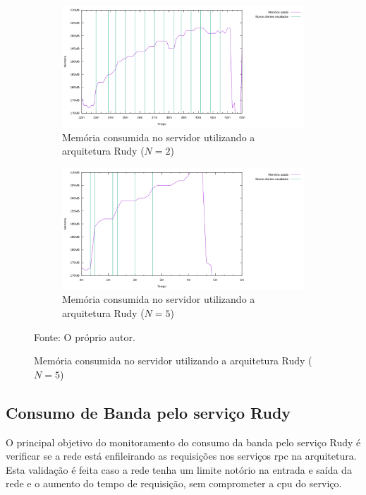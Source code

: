 \begin{figure}[htb!]
    \caption{Memória consumida no servidor utilizando a arquitetura Rudy ($N=2$ e $N=5$)}
    \centering
    \begin{subfigure}{1.0\textwidth}
      \centering
      \includegraphics[width=.9\textwidth]{metricas_rudy_t5/memory_used.png}
      \caption{Memória consumida no servidor utilizando a arquitetura Rudy ($N=2$)}
      \label{fig:rudy_t5_memory_used}
    \end{subfigure}


    \begin{subfigure}{1.0\textwidth}
      \centering
      \includegraphics[width=.9\textwidth]{metricas_rudy_t6/memory_used.png}
      \caption{Memória consumida no servidor utilizando a arquitetura Rudy ($N=5$)}
      \label{fig:rudy_t6_memory_used}
    \end{subfigure}
    \label{fig:rudy_t56_memory_used}

    Fonte: O próprio autor.
\end{figure}

\subsection{Consumo de Banda pelo serviço Rudy}

O principal objetivo do monitoramento do consumo da banda pelo serviço Rudy é verificar se a rede está enfileirando as requisições nos serviços \ac{rpc} na arquitetura.
%
Esta validação é feita caso a rede tenha um limite notório na entrada e saída da rede e o aumento do tempo de requisição, sem comprometer a \ac{cpu} do serviço.

